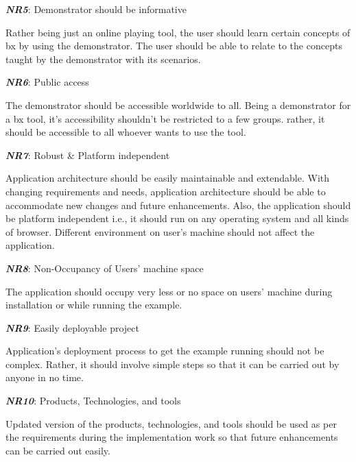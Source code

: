 \textbf{\textit{NR5}}: Demonstrator should be informative

Rather being just an online playing tool, the user should learn certain concepts of bx by using the demonstrator. The user should be able to relate to the concepts taught by the demonstrator with its scenarios.

\textbf{\textit{NR6}}: Public access

The demonstrator should be accessible worldwide to all. Being a demonstrator for a bx tool, it's accessibility shouldn't be restricted to a few groups. rather, it should be accessible to all whoever wants to use the tool.

\textbf{\textit{NR7}}: Robust \& Platform independent

Application architecture should be easily maintainable and extendable. With changing requirements and needs, application architecture should be able to accommodate new changes and future enhancements. Also, the application should be platform independent i.e., it should run on any operating system and all kinds of browser. Different environment on user's machine should not affect the application.

\textbf{\textit{NR8}}: Non-Occupancy of Users' machine space

The application should occupy very less or no space on users' machine during installation or while running the example. 
 
\textbf{\textit{NR9}}: Easily deployable project

Application's deployment process to get the example running should not be complex. Rather, it should involve simple steps so that it can be carried out by anyone in no time.

\textbf{\textit{NR10}}: Products, Technologies, and tools

Updated version of the products, technologies, and tools should be used as per the requirements during the implementation work so that future enhancements can be carried out easily.
